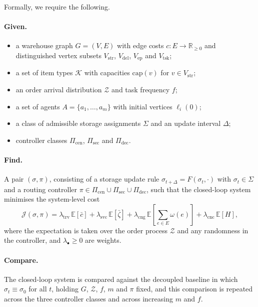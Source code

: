 Formally, we require the following.

\paragraph{Given.}
\begin{itemize}
  \item a warehouse graph \( G = (V, E) \) with edge costs \( c : E \to \mathbb{R}_{\geq 0} \)
        and distinguished vertex subsets \( V_{\mathrm{str}} \), \( V_{\mathrm{del}} \),
        \( V_{\mathrm{ep}} \) and \( V_{\mathrm{tsk}} \);
  \item a set of item types \( \mathcal{K} \) with capacities \( \mathrm{cap}(v) \)
        for \( v \in V_{\mathrm{str}} \);
  \item an order arrival distribution \( \mathcal{Z} \) and task frequency \( f \);
  \item a set of agents \( A = \{a_1, \dots, a_m\} \) with initial vertices \( \ell_i(0) \);
  \item a class of admissible storage assignments \( \Sigma \) and an update
        interval \( \Delta \);
  \item controller classes \( \Pi_{\mathrm{cen}} \), \( \Pi_{\mathrm{sec}} \) and
        \( \Pi_{\mathrm{dec}} \).
\end{itemize}

\paragraph{Find.}
A pair \( (\sigma, \pi) \), consisting of a storage update rule
\( \sigma_{t+\Delta} = F(\sigma_t, \cdot) \) with \( \sigma_t \in \Sigma \) and a
routing controller \( \pi \in \Pi_{\mathrm{cen}} \cup \Pi_{\mathrm{sec}} \cup
\Pi_{\mathrm{dec}} \), such that the closed-loop system minimises the
system-level cost
\begin{equation}
  \mathcal{J}(\sigma, \pi)
  = \lambda_{\mathrm{trv}}\, \mathbb{E}\!\left[ \bar{c} \right]
  + \lambda_{\mathrm{svc}}\, \mathbb{E}\!\left[ \bar{\zeta} \right]
  + \lambda_{\mathrm{cng}}\, \mathbb{E}\!\left[ \textstyle\sum_{e \in E} \omega(e) \right]
  + \lambda_{\mathrm{cnc}}\, \mathbb{E}\!\left[ H \right],
  \label{eq:system-cost}
\end{equation}
where the expectation is taken over the order process \( \mathcal{Z} \) and any
randomness in the controller, and \( \lambda_{\bullet} \geq 0 \) are weights.

\paragraph{Compare.}
The closed-loop system is compared against the decoupled baseline in which
\( \sigma_t \equiv \sigma_0 \) for all \( t \), holding \( G \),
\( \mathcal{Z} \), \( f \), \( m \) and \( \pi \) fixed, and this comparison
is repeated across the three controller classes and across increasing
\( m \) and \( f \).

